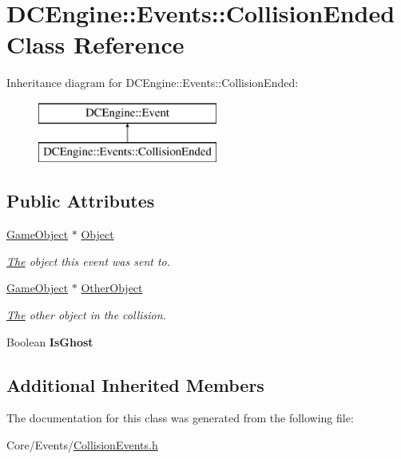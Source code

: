 \hypertarget{classDCEngine_1_1Events_1_1CollisionEnded}{\section{D\-C\-Engine\-:\-:Events\-:\-:Collision\-Ended Class Reference}
\label{classDCEngine_1_1Events_1_1CollisionEnded}
}
Inheritance diagram for D\-C\-Engine\-:\-:Events\-:\-:Collision\-Ended\-:\begin{figure}[H]
\begin{center}
\leavevmode
\includegraphics[height=2.000000cm]{classDCEngine_1_1Events_1_1CollisionEnded}
\end{center}
\end{figure}
\subsection*{Public Attributes}
\begin{DoxyCompactItemize}
\item 
\hypertarget{classDCEngine_1_1Events_1_1CollisionEnded_adc993f1e8a262271a68cdeedab678f6f}{\hyperlink{classDCEngine_1_1GameObject}{Game\-Object} $\ast$ \hyperlink{classDCEngine_1_1Events_1_1CollisionEnded_adc993f1e8a262271a68cdeedab678f6f}{Object}}\label{classDCEngine_1_1Events_1_1CollisionEnded_adc993f1e8a262271a68cdeedab678f6f}

\begin{DoxyCompactList}\small\item\em \hyperlink{classThe}{The} object this event was sent to. \end{DoxyCompactList}\item 
\hypertarget{classDCEngine_1_1Events_1_1CollisionEnded_a8681e405c6ad1ed260c6cef0ab4cae34}{\hyperlink{classDCEngine_1_1GameObject}{Game\-Object} $\ast$ \hyperlink{classDCEngine_1_1Events_1_1CollisionEnded_a8681e405c6ad1ed260c6cef0ab4cae34}{Other\-Object}}\label{classDCEngine_1_1Events_1_1CollisionEnded_a8681e405c6ad1ed260c6cef0ab4cae34}

\begin{DoxyCompactList}\small\item\em \hyperlink{classThe}{The} other object in the collision. \end{DoxyCompactList}\item 
\hypertarget{classDCEngine_1_1Events_1_1CollisionEnded_ad74e88ef2d614006ac1b8a6466f4a737}{Boolean {\bfseries Is\-Ghost}}\label{classDCEngine_1_1Events_1_1CollisionEnded_ad74e88ef2d614006ac1b8a6466f4a737}

\end{DoxyCompactItemize}
\subsection*{Additional Inherited Members}


The documentation for this class was generated from the following file\-:\begin{DoxyCompactItemize}
\item 
Core/\-Events/\hyperlink{CollisionEvents_8h}{Collision\-Events.\-h}\end{DoxyCompactItemize}
